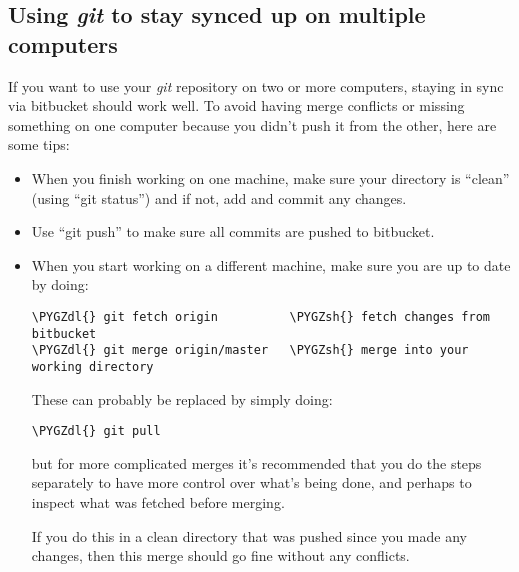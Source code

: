 \documentclass[letterpaper,10pt,english]{sphinxmanual}
\def\PYGZsh{\char`\#}
\def\PYGZdl{\char`\$}
\begin{document}
\subsection{Using \emph{git} to stay synced up on multiple computers}
\label{git_more:using-git-to-stay-synced-up-on-multiple-computers}
If you want to use your \emph{git} repository on two or more computers, staying
in sync via bitbucket should work well. To avoid having merge conflicts or
missing something on one computer because you didn't push it from the other,
here are some tips:
\begin{itemize}
\item {} 
When you finish working on one machine, make sure your directory is
``clean'' (using ``git status'') and if not, add and commit any changes.

\item {} 
Use ``git push'' to make sure all commits are pushed to bitbucket.

\item {} 
When you start working on a different machine, make sure you are up to
date by doing:

\begin{Verbatim}[commandchars=\\\{\}]
\PYGZdl{} git fetch origin          \PYGZsh{} fetch changes from bitbucket
\PYGZdl{} git merge origin/master   \PYGZsh{} merge into your working directory
\end{Verbatim}

These can probably be replaced by simply doing:

\begin{Verbatim}[commandchars=\\\{\}]
\PYGZdl{} git pull
\end{Verbatim}

but for more complicated merges it's recommended that you do the steps
separately to have more control over what's being done, and perhaps to
inspect what was fetched before merging.

If you do this in a clean directory that was pushed since you made any
changes, then this merge should go fine without any conflicts.

\end{itemize}
\end{document}
